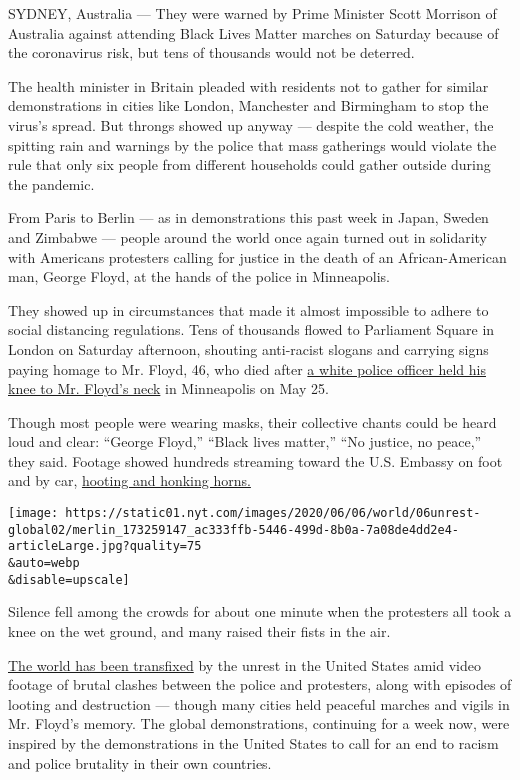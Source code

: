 SYDNEY, Australia --- They were warned by Prime Minister Scott Morrison
of Australia against attending Black Lives Matter marches on Saturday
because of the coronavirus risk, but tens of thousands would not be
deterred.

The health minister in Britain pleaded with residents not to gather for
similar demonstrations in cities like London, Manchester and Birmingham
to stop the virus's spread. But throngs showed up anyway --- despite the
cold weather, the spitting rain and warnings by the police that mass
gatherings would violate the rule that only six people from different
households could gather outside during the pandemic.

From Paris to Berlin --- as in demonstrations this past week in Japan,
Sweden and Zimbabwe --- people around the world once again turned out in
solidarity with Americans protesters calling for justice in the death of
an African-American man, George Floyd, at the hands of the police in
Minneapolis.

They showed up in circumstances that made it almost impossible to adhere
to social distancing regulations. Tens of thousands flowed to Parliament
Square in London on Saturday afternoon, shouting anti-racist slogans and
carrying signs paying homage to Mr. Floyd, 46, who died after
\href{https://www.nytimes.com/2020/05/27/us/george-floyd-minneapolis-death.html?searchResultPosition=4}{a
white police officer held his knee to Mr. Floyd's neck} in Minneapolis
on May 25.

Though most people were wearing masks, their collective chants could be
heard loud and clear: ``George Floyd,'' ``Black lives matter,'' ``No
justice, no peace,'' they said. Footage showed hundreds streaming toward
the U.S. Embassy on foot and by car,
\href{https://twitter.com/emmabowds/status/1269294466042658817}{hooting
and honking horns.}

\texttt{[image: https://static01.nyt.com/images/2020/06/06/world/06unrest-global02/merlin\_173259147\_ac333ffb-5446-499d-8b0a-7a08de4dd2e4-articleLarge.jpg?quality=75\\\&auto=webp\\\&disable=upscale]}

Silence fell among the crowds for about one minute when the protesters
all took a knee on the wet ground, and many raised their fists in the
air.

\href{https://www.nytimes.com/2020/06/03/world/americas/global-protests-george-floyd.html?searchResultPosition=2}{The
world has been transfixed} by the unrest in the United States amid video
footage of brutal clashes between the police and protesters, along with
episodes of looting and destruction --- though many cities held peaceful
marches and vigils in Mr. Floyd's memory. The global demonstrations,
continuing for a week now, were inspired by the demonstrations in the
United States to call for an end to racism and police brutality in their
own countries.

